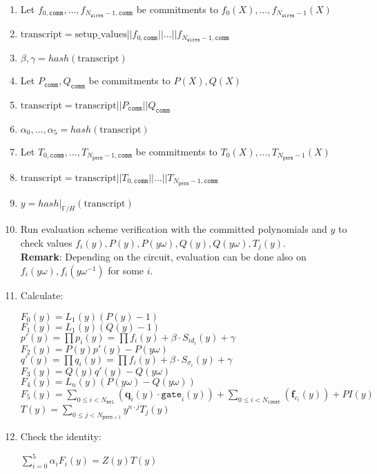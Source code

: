 \begin{enumerate}
    \item Let $f_{0, \texttt{comm}}, \dots, f_{N_{\texttt{wires}} - 1, \texttt{comm}}$ be commitments to $f_{0}(X), \dots, f_{N_{\texttt{wires}} - 1}(X)$
    \item $\text{transcript} = \text{setup\_values} || f_{0, \texttt{comm}} || \dots || f_{N_{\texttt{wires}} - 1, \texttt{comm}}$
    \item $\beta, \gamma = hash(\text{transcript})$
    \item Let $P_{\texttt{comm}}, Q_{\texttt{comm}}$ be commitments to $P(X), Q(X)$
    \item $\text{transcript} = \text{transcript} || P_{\texttt{comm}} || Q_{\texttt{comm}}$
    \item $\alpha_0, \dots, \alpha_5 = hash(\text{transcript})$
    \item Let $T_{0, \texttt{comm}}, ..., T_{N_{\texttt{perm}} - 1, \texttt{comm}}$ be commitments to $T_0(X), ..., T_{N_{\texttt{perm}} - 1}(X)$
    \item $\text{transcript} = \text{transcript} || T_{0, \texttt{comm}} || ... || T_{N_{\texttt{perm}} - 1, \texttt{comm}}$
    \item $y = hash|_{\mathbb{F}/H}(\text{transcript})$
    \item Run evaluation scheme verification with the committed polynomials and $y$ to check values
    $f_i(y), P(y), P(y\omega), Q(y), Q(y\omega), T_j(y)$.  \\
    \textbf{Remark}: Depending on the circuit, evaluation can be done also on $f_i(y\omega), f_i(y\omega^{-1})$ for some $i$.
    \item Calculate:
    \begin{center}
        $F_0(y) = L_1(y)(P(y) - 1)$ \\
        $F_1(y) = L_1(y)(Q(y) - 1)$ \\
        $p'(y) = \prod p_i(y) = \prod f_i(y) + \beta \cdot S_{id_i}(y) + \gamma$ \\
        $F_2(y) = P(y)p'(y) - P(y\omega)$ \\
        $q'(y) = \prod q_i(y) = \prod f_i(y) + \beta \cdot S_{\sigma_i}(y) + \gamma$ \\
        $F_3(y) = Q(y)q'(y) - Q(y\omega)$ \\
        $F_4(y) = L_n(y)(P(y\omega) - Q(y\omega))$ \\
        $F_5(y) = \sum\limits_{0 \leq i < N_{\texttt{sel}}} (\textbf{q}_{i}(y) \cdot \texttt{gate}_i(y))
        + \sum\limits_{0 \leq i < N_{\texttt{const}}}(\textbf{f}_{c_i}(y)) + PI(y)$ \\
        $T(y) = \sum\limits_{0 \leq j < N_{\texttt{perm} + 1}}y^{n \cdot j}T_j(y)$
    \end{center}
    \item Check the identity:
    \begin{center}
        $\sum\limits_{i = 0}^5\alpha_iF_i(y) = Z(y)T(y)$
    \end{center}
\end{enumerate}
